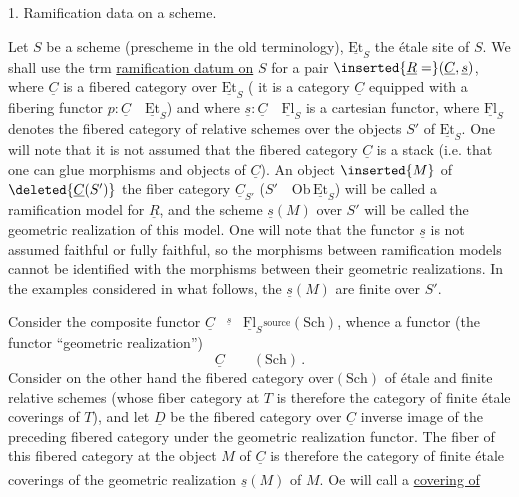 1. Ramification data on a scheme.

Let $S$ be a scheme (prescheme in the old terminology), $\underline{\mathrm{Et}}_S$ the étale site of $S$. We shall use the trm \uline{ramification datum on} $S$ for  a pair $\inserted{\underline{R}=}(\underline{C},\underline{s})$, where $\underline{C}$ is a fibered category over $\underline{\mathrm{Et}}_S$ ( it is a category $\underline{C}$ equipped with a fibering functor $p:\underline{C}\quad\underline{\mathrm{Et}}_S$) and where $\underline{s}:\underline{C}\quad\underline{\mathrm{Fl}}_S$ is a cartesian functor, where $\underline{\mathrm{Fl}}_S$ denotes the fibered category of  relative schemes over the objects $S'$ of $\underline{\mathrm{Et}}_S$. One will note that it is not assumed that the fibered category $\underline{C}$ is a stack (i.e. that one can glue morphisms and objects of $\underline{C}$). An object $\inserted{M}$ of $\deleted{\underline{C}(S')}$ the fiber category $\underline{C}_{S'}$ ($S'\quad\mathrm{Ob}\,\underline{\mathrm{Et}}_S$) will be called a ramification model for $\underline{R}$, and the scheme $\underline{s}(M)$ over $S'$ will be called the geometric realization of this model. One will note that the functor $\underline{s}$ is not assumed faithful or fully faithful, so the morphisms between ramification models cannot be identified with the morphisms between their geometric realizations. In the examples considered in what follows, the $\underline{s}(M)$ are finite over $S'$.

Consider the composite functor $\underline{C}\overset{\underline{s}}{\qquad}\underline{\mathrm{Fl}}_S\overset{\mathrm{source}}{\qquad}(\mathrm{Sch})$, whence a functor (the functor ``geometric realization'')
\[
\underline{C}\qquad(\mathrm{Sch})\,.
\]
Consider on the other hand the fibered category over$(\mathrm{Sch})$ of étale and finite relative schemes (whose fiber category at $T$ is therefore the category of finite étale coverings of $T$), and let $\underline{D}$ be the fibered category over $\underline{C}$ inverse image of the preceding fibered category under the geometric realization functor. The fiber of this fibered category at the object $M$ of $\underline{C}$ is therefore the category of finite étale coverings of the geometric realization $\underline{s}(M)$ of $M$. O\textsuperscript{}e will call a \uline{covering of} 

